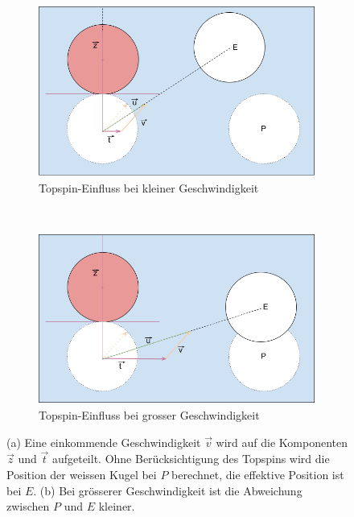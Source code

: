 \begin{figure}[h!]
    \centering
    \begin{subfigure}[b]{0.8\textwidth}
        \includegraphics[width=1\textwidth]{../common/03_billiard_ai/resources/33_topspin_kleine_geschwindigkeit.png}
        \caption{Topspin-Einfluss bei kleiner Geschwindigkeit}
        \label{fig:topspin_kleine_geschwindigkeit}
    \end{subfigure}\\
    \begin{subfigure}[b]{0.8\textwidth}
        \includegraphics[width=1\textwidth]{../common/03_billiard_ai/resources/34_topspin_grosse_geschwindigkeit.png}
        \caption{Topspin-Einfluss bei grosser Geschwindigkeit}
        \label{fig:topspin_grosse_geschwindigkeit}
    \end{subfigure}
    \caption{(a) Eine einkommende Geschwindigkeit $\vec{v}$ wird auf die Komponenten $\vec{z}$ und $\vec{t}$ aufgeteilt. Ohne Berücksichtigung des Topspins wird die Position der weissen Kugel bei $P$ berechnet, die effektive Position ist bei $E$. (b) Bei grösserer Geschwindigkeit ist die Abweichung zwischen $P$ und $E$ kleiner.}
    \label{fig:einfluss_topspin}
\end{figure}

